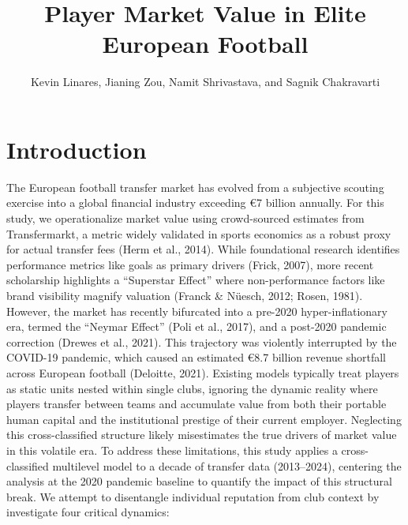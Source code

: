 \documentclass[
  12pt,
]{article}
\title{Player Market Value in Elite European Football}
\author{Kevin Linares, Jianing Zou, Namit Shrivastava, and Sagnik
Chakravarti}
\date{}
\begin{document}
\maketitle


\section{Introduction}\label{introduction}

The European football transfer market has evolved from a subjective
scouting exercise into a global financial industry exceeding €7 billion
annually. For this study, we operationalize market value using
crowd-sourced estimates from Transfermarkt, a metric widely validated in
sports economics as a robust proxy for actual transfer fees (Herm et
al., 2014). While foundational research identifies performance metrics
like goals as primary drivers (Frick, 2007), more recent scholarship
highlights a ``Superstar Effect'' where non-performance factors like
brand visibility magnify valuation (Franck \& Nüesch, 2012; Rosen,
1981). However, the market has recently bifurcated into a pre-2020
hyper-inflationary era, termed the ``Neymar Effect'' (Poli et al.,
2017), and a post-2020 pandemic correction (Drewes et al., 2021). This
trajectory was violently interrupted by the COVID-19 pandemic, which
caused an estimated €8.7 billion revenue shortfall across European
football (Deloitte, 2021). Existing models typically treat players as
static units nested within single clubs, ignoring the dynamic reality
where players transfer between teams and accumulate value from both
their portable human capital and the institutional prestige of their
current employer. Neglecting this cross-classified structure likely
misestimates the true drivers of market value in this volatile era. To
address these limitations, this study applies a cross-classified
multilevel model to a decade of transfer data (2013--2024), centering
the analysis at the 2020 pandemic baseline to quantify the impact of
this structural break. We attempt to disentangle individual reputation
from club context by investigate four critical dynamics:
\end{document}
